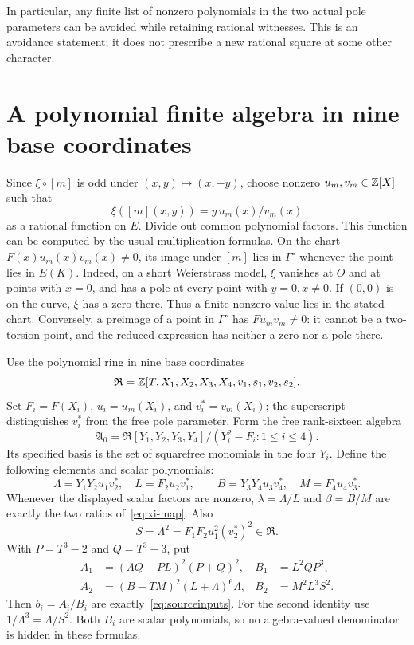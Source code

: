 \documentclass[11pt,a4paper]{article}
\begin{document}
In particular, any finite list of nonzero polynomials in the two actual
pole parameters can be avoided while retaining rational witnesses.
This is an avoidance statement; it does not prescribe a new rational
square at some other character.

\section{A polynomial finite algebra in nine base coordinates}

Since \(\xi\circ[m]\) is odd under \((x,y)\mapsto(x,-y)\), choose
nonzero \(u_m,v_m\in\mathbb Z[X]\) such that
\begin{equation}\label{eq:xi-map}
              \xi([m](x,y))=y\,u_m(x)/v_m(x)
\end{equation}
as a rational function on \(E\). Divide out common polynomial factors.
This function can be computed by the usual multiplication formulas.
On the chart \(F(x)u_m(x)v_m(x)\ne0\), its image under \([m]\)
lies in \(\Gamma^\circ\) whenever the point lies in \(E(K)\).
Indeed, on a short Weierstrass model, \(\xi\) vanishes at \(O\) and
at points with \(x=0\), and has a pole at every point with
\(y=0,x\ne0\). If \((0,0)\) is on the curve, \(\xi\) has a zero
there. Thus a finite nonzero value lies in the stated chart.
Conversely, a preimage of a point in \(\Gamma^\circ\) has
\(F u_m v_m\ne0\): it cannot be a two-torsion point, and the reduced
expression has neither a zero nor a pole there.

Use the polynomial ring in nine base coordinates
\[
 \mathfrak R=\mathbb Z[T,X_1,X_2,X_3,X_4,v_1,s_1,v_2,s_2].
\]
Set \(F_i=F(X_i)\), \(u_i=u_m(X_i)\), and \(v_i^*=v_m(X_i)\);
the superscript distinguishes \(v_i^*\) from the free pole parameter.
Form the free rank-sixteen algebra
\[
 \mathfrak A_0=\mathfrak R[Y_1,Y_2,Y_3,Y_4]/
                    (Y_i^2-F_i:1\le i\le4).
\]
Its specified basis is the set of squarefree monomials in the four
\(Y_i\). Define the following elements and scalar polynomials:
\[
 \Lambda=Y_1Y_2u_1v_2^*,\quad L=F_2u_2v_1^*,\qquad
 B=Y_3Y_4u_3v_4^*,\quad M=F_4u_4v_3^*.
\]
Whenever the displayed scalar factors are nonzero,
\(\lambda=\Lambda/L\) and \(\beta=B/M\) are exactly the two
ratios of~\eqref{eq:xi-map}. Also
\[
                     S=\Lambda^2=F_1F_2u_1^2(v_2^*)^2\in\mathfrak R.
\]
With \(P=T^3-2\) and \(Q=T^3-3\), put
\begin{align}
 A_1&=(\Lambda Q-PL)^2(P+Q)^2,&
 B_1&=L^2QP^3,\label{eq:a1}\\
 A_2&=(B-TM)^2(L+\Lambda)^6\Lambda,&
 B_2&=M^2L^3S^2.\label{eq:a2}
\end{align}
Then \(b_i=A_i/B_i\) are exactly~\eqref{eq:sourceinputs}.
For the second identity use \(1/\Lambda^3=\Lambda/S^2\).
Both \(B_i\) are scalar polynomials, so no algebra-valued denominator
is hidden in these formulas.
\end{document}
